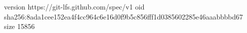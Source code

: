 version https://git-lfs.github.com/spec/v1
oid sha256:8ada1cee152ea4f4cc964c6e16d0f9b5c856fff1d0385602285e46aaabbbbd67
size 15856

